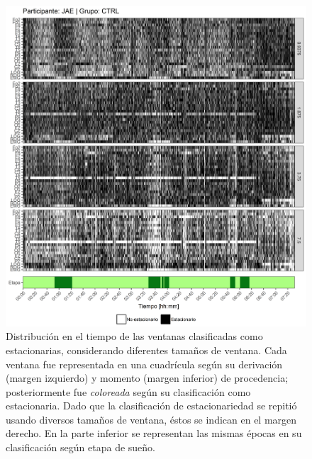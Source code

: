 \begin{figure}
\centering
\includegraphics[width=\linewidth]
{./scripts_graf_res/JAE_patrones_1.png}
\caption[Distribución en el tiempo de las ventanas clasificadas como estacionarias, considerando diferentes tamaños de ventana]{Distribución en el tiempo de las ventanas clasificadas como estacionarias, considerando diferentes tamaños de ventana. 
Cada ventana fue representada en una cuadrícula según su derivación (margen izquierdo) y momento (margen inferior) de procedencia; posteriormente fue \textit{coloreada} según su clasificación como estacionaria.
Dado que la clasificación de estacionariedad se repitió usando diversos tamaños de ventana, éstos se indican en el margen derecho.
En la parte inferior se representan las mismas épocas en su clasificación según etapa de sueño.}
\end{figure}
